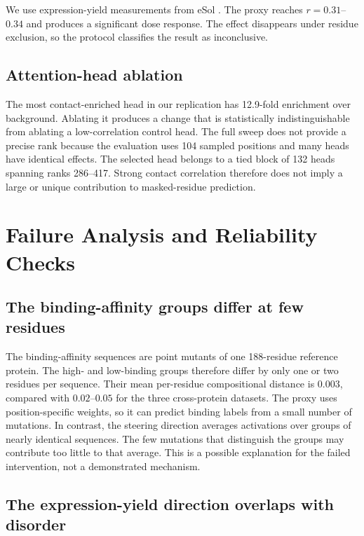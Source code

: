 \documentclass{article}
\begin{document}
We use expression-yield measurements from eSol
\citep{niwa2009esol}. The proxy reaches $r=0.31$--$0.34$ and produces a
significant dose response. The effect disappears under residue
exclusion, so the protocol classifies the result as inconclusive.

\subsection{Attention-head ablation}

The most contact-enriched head in our replication has 12.9-fold
enrichment over background. Ablating it produces a change that is
statistically indistinguishable from ablating a low-correlation control
head. The full sweep does not provide a precise rank because the
evaluation uses 104 sampled positions and many heads have identical
effects. The selected head belongs to a tied block of 132 heads spanning
ranks 286--417. Strong contact correlation therefore does not imply a
large or unique contribution to masked-residue prediction.

\section{Failure Analysis and Reliability Checks}
\label{sec:failure}

\subsection{The binding-affinity groups differ at few residues}

The binding-affinity sequences are point mutants of one 188-residue
reference protein. The high- and low-binding groups therefore differ by
only one or two residues per sequence. Their mean per-residue
compositional distance is $0.003$, compared with $0.02$--$0.05$ for the
three cross-protein datasets. The proxy uses position-specific weights,
so it can predict binding labels from a small number of mutations. In
contrast, the steering direction averages activations over groups of
nearly identical sequences. The few mutations that distinguish the
groups may contribute too little to that average. This is a possible
explanation for the failed intervention, not a demonstrated mechanism.

\subsection{The expression-yield direction overlaps with disorder}
\end{document}
